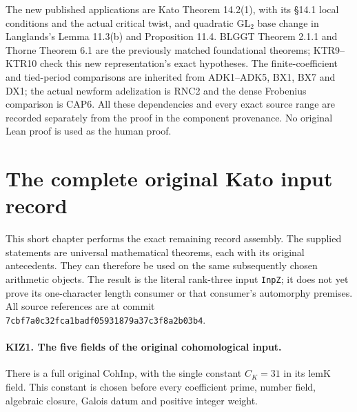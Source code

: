 \documentclass[11pt,a4paper]{article}
\numberwithin{equation}{section}
\theoremstyle{remark}\newtheorem{remark}[theorem]{Remark}
\begin{document}
The new published applications are Kato Theorem 14.2(1), with
its \S14.1 local conditions and the actual critical twist, and
quadratic \(\mathrm{GL}_2\) base change in Langlands's
Lemma 11.3(b) and Proposition 11.4.  BLGGT Theorem 2.1.1 and
Thorne Theorem 6.1 are the previously matched foundational
theorems; KTR9--KTR10 check this new representation's exact
hypotheses.  The finite-coefficient and tied-period comparisons
are inherited from ADK1--ADK5, BX1, BX7 and DX1; the actual
newform adelization is RNC2 and the dense Frobenius comparison
is CAP6.  All these dependencies and every exact source range
are recorded separately from the proof in the component
provenance.  No original Lean proof is used as the human proof.


\section{The complete original Kato input record}
\label{sec:kato-input-assembly-v47}

This short chapter performs the exact remaining record assembly.
The supplied statements are universal mathematical theorems, each
with its original antecedents.  They can therefore be used on the
same subsequently chosen arithmetic objects.  The result is the
literal rank-three input \texttt{Inp\allowbreak Z}; it does not yet prove its
one-character length consumer or that consumer's automorphy premises.
All source references are at commit
\texttt{7cbf7a0c32fca1badf05931879a37c3f8a2b03b4}.

\paragraph{KIZ1. The five fields of the original cohomological input.}
\label{claim:KIZ1}
There is a full original \(\mathrm{CohInp}\), with the single
constant \(C_K=31\) in its \(\mathrm{lemK}\) field.  This constant
is chosen before every coefficient prime, number field, algebraic
closure, Galois datum and positive integer weight.
\end{document}
